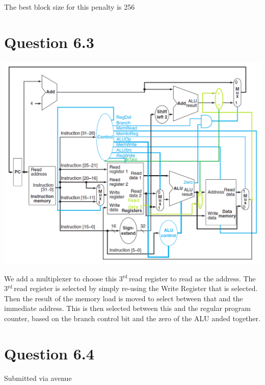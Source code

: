 \documentclass[11pt]{article} %
\newcommand{\rd}{$^{\text{rd}\ }$}
\begin{document}
The best block size for this penalty is 256

\section{Question 6.3}


\includegraphics[width=\textwidth]{CPU.png}

We add a multiplexer to choose this 3\rd read register to read as the address. The 3\rd read register is selected by simply re-using the Write Register that is selected. Then the result of the memory load is moved to select between that and the immediate address. This is then selected between this and the regular program counter, based on the branch control bit and the zero of the ALU anded together.

\section{Question 6.4}

Submitted via avenue
\end{document}
